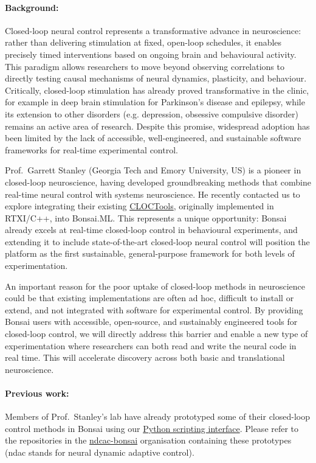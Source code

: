 \paragraph{Background:} Closed-loop neural control represents a transformative
advance in neuroscience:  rather than delivering stimulation at fixed,
open-loop schedules, it enables precisely timed interventions based on ongoing
brain and behavioural activity. This paradigm allows researchers to move beyond
observing correlations to  directly testing causal mechanisms of neural
dynamics, plasticity, and behaviour. Critically, closed-loop stimulation has
already proved transformative in the  clinic, for example in deep brain
stimulation for Parkinson’s disease and  epilepsy, while its extension to other
disorders (e.g. depression, obsessive  compulsive disorder) remains an active
area of research. Despite this promise, widespread adoption has been limited
by the lack of accessible, well-engineered,  and sustainable software
frameworks for real-time experimental control.

Prof.~Garrett Stanley (Georgia Tech and Emory University, US) is a pioneer in
closed-loop neuroscience, having developed groundbreaking methods that combine
real-time neural control with systems neuroscience. He recently contacted us to
explore integrating their existing
\href{https://cloctools.github.io/}{CLOCTools}, originally implemented in
RTXI/C++, into Bonsai.ML.  This represents a unique opportunity: Bonsai already
excels at real-time closed-loop control in behavioural experiments, and
extending it to include state-of-the-art closed-loop neural control will
position the platform as the first sustainable, general-purpose framework for
both levels of experimentation.

An important reason for the poor uptake of closed-loop methods in neuroscience
could be that existing implementations are often ad hoc, difficult to install
or  extend, and not integrated with software for experimental control. By
providing Bonsai users with accessible, open-source, and sustainably engineered
tools for closed-loop control, we will directly address this barrier and enable
a new type of experimentation where researchers can both read and write the
neural code in real time. This will accelerate discovery across both basic and
translational neuroscience.

\paragraph{Previous work:} Members of Prof.~Stanley’s lab have already
prototyped some of their closed-loop control methods in Bonsai using our
\href{https://bonsai-rx.org/python-scripting/}{Python scripting interface}.
Please refer to the repositories in the
\href{https://github.com/ndac-bonsai}{ndcac-bonsai} organisation containing
these prototypes (ndac stands for neural dynamic adaptive control).

